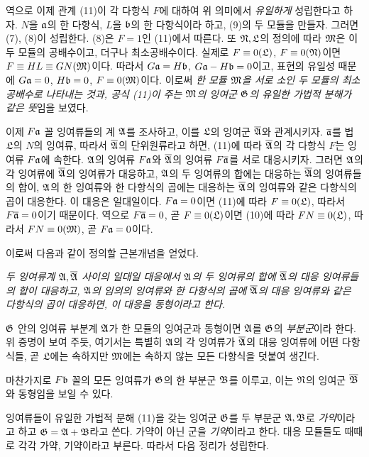 역으로 이제 관계 (11)이 각 다항식 \(F\)에 대하여 위 의미에서 \emph{유일하게} 성립한다고 하자. \(N\)을 \(\mathfrak{a}\)의 한 다항식, \(L\)을 \(\mathfrak{b}\)의 한 다항식이라 하고, (9)의 두 모듈을 만들자. 그러면 (7), (8)이 성립한다. (8)은 \(F=1\)인 (11)에서 따른다. 또 \(\mathfrak N,\mathfrak L\)의 정의에 따라 \(\mathfrak M\)은 이 두 모듈의 공배수이고, 더구나 최소공배수이다. 실제로 \(F\equiv0(\mathfrak L)\), \(F\equiv0(\mathfrak N)\)이면 \(F\equiv HL\equiv GN(\mathfrak M)\)이다. 따라서 \(G\mathfrak{a}=H\mathfrak{b}\), \(G\mathfrak{a}-H\mathfrak{b}=0\)이고, 표현의 유일성 때문에 \(G\mathfrak{a}=0\), \(H\mathfrak{b}=0\), \(F\equiv0(\mathfrak M)\)이다. 이로써 \emph{한 모듈 \(\mathfrak M\)을 서로 소인 두 모듈의 최소공배수로 나타내는 것과, 공식 (11)이 주는 \(\mathfrak M\)의 잉여군 \(\mathfrak G\)의 유일한 가법적 분해가 같은 뜻}임을 보였다.

이제 \(F\mathfrak{a}\) 꼴 잉여류들의 계 \(\mathfrak A\)를 조사하고, 이를 \(\mathfrak L\)의 잉여군 \(\overline{\mathfrak A}\)와 관계시키자. \(\overline{\mathfrak a}\)를 법 \(\mathfrak L\)의 \(N\)의 잉여류, 따라서 \(\overline{\mathfrak A}\)의 단위원류라고 하면, (11)에 따라 \(\overline{\mathfrak A}\)의 각 다항식 \(F\)는 잉여류 \(F\mathfrak{a}\)에 속한다. \(\mathfrak A\)의 잉여류 \(F\mathfrak{a}\)와 \(\overline{\mathfrak A}\)의 잉여류 \(F\overline{\mathfrak a}\)를 서로 대응시키자. 그러면 \(\mathfrak A\)의 각 잉여류에 \(\overline{\mathfrak A}\)의 잉여류가 대응하고, \(\mathfrak A\)의 두 잉여류의 합에는 대응하는 \(\overline{\mathfrak A}\)의 잉여류들의 합이, \(\mathfrak A\)의 한 잉여류와 한 다항식의 곱에는 대응하는 \(\overline{\mathfrak A}\)의 잉여류와 같은 다항식의 곱이 대응한다. 이 대응은 일대일이다. \(F\mathfrak{a}=0\)이면 (11)에 따라 \(F\equiv0(\mathfrak L)\), 따라서 \(F\overline{\mathfrak a}=0\)이기 때문이다. 역으로 \(F\overline{\mathfrak a}=0\), 곧 \(F\equiv0(\mathfrak L)\)이면 (10)에 따라 \(FN\equiv0(\mathfrak L)\), 따라서 \(FN\equiv0(\mathfrak M)\), 곧 \(F\mathfrak{a}=0\)이다.

이로써 다음과 같이 정의할 근본개념을 얻었다.

\emph{두 잉여류계 \(\mathfrak A,\overline{\mathfrak A}\) 사이의 일대일 대응에서 \(\mathfrak A\)의 두 잉여류의 합에 \(\overline{\mathfrak A}\)의 대응 잉여류들의 합이 대응하고, \(\mathfrak A\)의 임의의 잉여류와 한 다항식의 곱에 \(\overline{\mathfrak A}\)의 대응 잉여류와 같은 다항식의 곱이 대응하면, 이 대응을 동형이라고 한다.}

\(\mathfrak G\) 안의 잉여류 부분계 \(\mathfrak A\)가 한 모듈의 잉여군과 동형이면 \(\mathfrak A\)를 \(\mathfrak G\)의 \emph{부분군}이라 한다. 위 증명이 보여 주듯, 여기서는 특별히 \(\mathfrak A\)의 각 잉여류가 \(\overline{\mathfrak A}\)의 대응 잉여류에 어떤 다항식들, 곧 \(\mathfrak L\)에는 속하지만 \(\mathfrak M\)에는 속하지 않는 모든 다항식을 덧붙여 생긴다.

마찬가지로 \(F\mathfrak{b}\) 꼴의 모든 잉여류가 \(\mathfrak G\)의 한 부분군 \(\mathfrak B\)를 이루고, 이는 \(\mathfrak N\)의 잉여군 \(\overline{\mathfrak B}\)와 동형임을 보일 수 있다.

잉여류들이 유일한 가법적 분해 (11)을 갖는 잉여군 \(\mathfrak G\)를 두 부분군 \(\mathfrak A,\mathfrak B\)로 \emph{가약}이라고 하고 \(\mathfrak G=\mathfrak A+\mathfrak B\)라고 쓴다. 가약이 아닌 군을 \emph{기약}이라고 한다. 대응 모듈들도 때때로 각각 가약, 기약이라고 부른다. 따라서 다음 정리가 성립한다.

